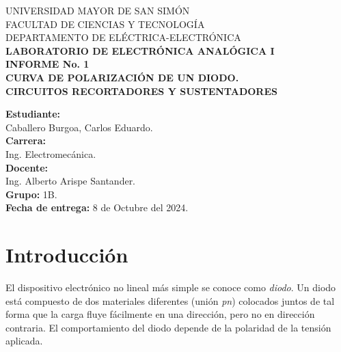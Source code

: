 \documentclass[letter,twoside,11pt]{article}
\newcommand{\blankpage}{
\newpage
\thispagestyle{empty}
\mbox{}
\newpage
}
\begin{document}
\begin{titlepage}
    \begin{center}
        {\Large UNIVERSIDAD MAYOR DE SAN SIMÓN}\\
        \vspace*{0.15cm}
        {\large FACULTAD DE CIENCIAS Y TECNOLOGÍA}\\
        \vspace*{0.10cm}
        DEPARTAMENTO DE ELÉCTRICA-ELECTRÓNICA\\
        \vspace*{3.0cm}
        {\Large \textbf{LABORATORIO DE ELECTRÓNICA ANALÓGICA I}}\\
        \vspace*{0.3cm}
        {\Large \textbf{INFORME No. 1}}\\
        \vspace*{3.5cm}
        {\Large \textbf{CURVA DE POLARIZACIÓN DE UN DIODO.\\
        CIRCUITOS RECORTADORES Y SUSTENTADORES}}\\
    \end{center}

    \vspace*{5.8cm}
    \leftskip=7.95cm
    \noindent
    \textbf{Estudiante:}\\
    Caballero Burgoa, Carlos Eduardo.\\
    \newline
    \textbf{Carrera:}\\
    Ing. Electromecánica.\\
    \newline
    \textbf{Docente:}\\
    Ing. Alberto Arispe Santander.\\
    \newline
    \textbf{Grupo:} 1B.\\
    \textbf{Fecha de entrega:} 8 de Octubre del 2024.\\
\end{titlepage}
\addtocounter{page}{-1}

\blankpage
\addtocounter{page}{-1}

\section{Introducción}
El dispositivo electrónico no lineal más simple se conoce como \emph{diodo}. Un
diodo está compuesto de dos materiales diferentes (unión \emph{pn}) colocados
juntos de tal forma que la carga fluye fácilmente en una dirección, pero no en
dirección contraria. El comportamiento del diodo depende de la polaridad de la
tensión aplicada.
\end{document}
